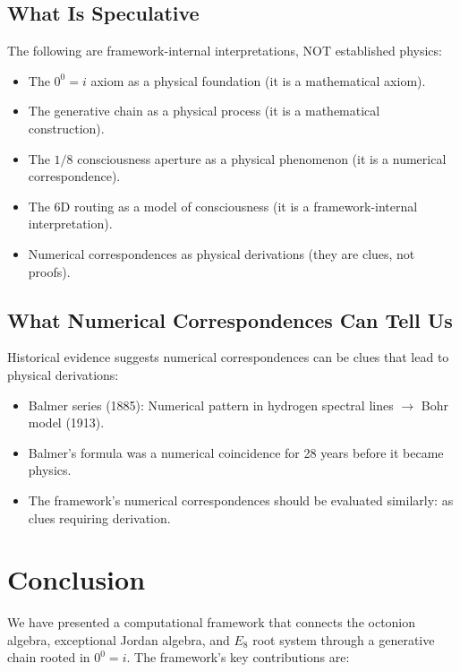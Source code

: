 \documentclass[11pt]{article}
\begin{document}
\subsection{What Is Speculative}

The following are framework-internal interpretations, NOT established physics:
\begin{itemize}
\item The $0^0 = i$ axiom as a physical foundation (it is a mathematical axiom).
\item The generative chain as a physical process (it is a mathematical construction).
\item The $1/8$ consciousness aperture as a physical phenomenon (it is a numerical correspondence).
\item The 6D routing as a model of consciousness (it is a framework-internal interpretation).
\item Numerical correspondences as physical derivations (they are clues, not proofs).
\end{itemize}

\subsection{What Numerical Correspondences Can Tell Us}

Historical evidence suggests numerical correspondences can be clues that lead to physical derivations:
\begin{itemize}
\item Balmer series (1885): Numerical pattern in hydrogen spectral lines $\to$ Bohr model (1913).
\item Balmer's formula was a numerical coincidence for 28 years before it became physics.
\item The framework's numerical correspondences should be evaluated similarly: as clues requiring derivation.
\end{itemize}

\section{Conclusion}

We have presented a computational framework that connects the octonion algebra, exceptional Jordan algebra, and $E_8$ root system through a generative chain rooted in $0^0 = i$. The framework's key contributions are:
\end{document}
